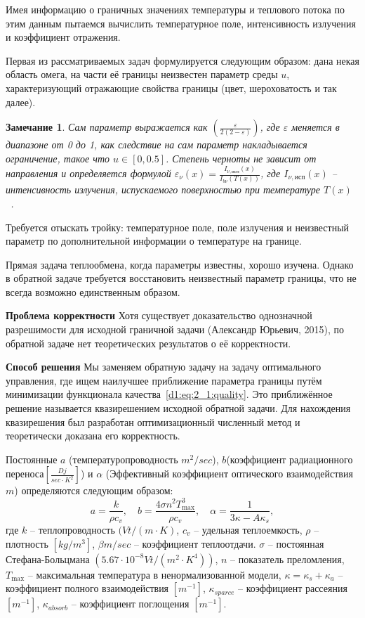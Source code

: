 \documentclass[8pt,a4paper]{article}
\newtheorem*{remark}{Замечание}
\begin{document}
    Имея информацию о граничных значениях температуры и теплового потока
    по этим данным пытаемся вычислить температурное поле, интенсивность излучения и коэффициент отражения.


    Первая из рассматриваемых задач формулируется следующим образом:
    дана некая область омега,
    на части её границы неизвестен параметр среды $u$, характеризующий отражающие свойства границы
    (цвет, шероховатость и так далее).
    \begin{remark}
        Сам параметр выражается как $(\frac{\varepsilon}{2(2-\varepsilon)})$,
        где $\varepsilon$ меняется в диапазоне от 0 до 1,
        как следствие на сам параметр накладывается ограничение, такое что $u \in [0, 0.5]$.
        Степень черноты не зависит от направления и определяется формулой
        $\varepsilon_\nu(x) = \frac{I_{\nu,\text{исп}}(x)}{I_{b\nu}(T(x))}$, где
        $I_{\nu,\text{исп}}(x)$ -- интенсивность излучения, испускаемого
        поверхностью при температуре $T(x)$~\cite[53]{Ozisik1976}.

    \end{remark}

    Требуется отыскать тройку: температурное поле,
    поле излучения и неизвестный параметр
    по дополнительной информации о температуре на границе.

    Прямая задача теплообмена, когда параметры известны, хорошо изучена.
    Однако в обратной задаче требуется восстановить неизвестный параметр границы,
    что не всегда возможно единственным образом.

    \textbf{Проблема корректности}
    Хотя существует доказательство однозначной разрешимости для исходной граничной задачи (Александр Юрьевич, 2015),
    по обратной задаче нет теоретических результатов о её корректности.

    \textbf{Способ решения}
    Мы заменяем обратную задачу на задачу оптимального управления, где ищем наилучшее
    приближение параметра границы путём минимизации функционала качества~\eqref{d1:eq:2_1:quality}.
    Это приближённое решение называется квазирешением исходной обратной задачи.
    Для нахождения квазирешения был разработан оптимизационный численный метод и теоретически доказана его корректность.

    Постоянные $a$ (температуропроводность $m^2/sec$), $b$(коэффициент радиационного переноса$[\frac{Dj}{sec \cdot K^2}]$) и
    $\alpha$ (Эффективный коэффициент оптического взаимодействия $m$)
    определяются следующим образом:
    \[
        a = \frac{k}{\rho c_v},\quad b = \frac{4\sigma n^2 T_{\max}^3}{\rho c_v},
        \quad \alpha=\frac{1}{3\kappa - A \kappa_s},
    \]
    где $k$ -- теплопроводность $(Vt/(m \cdot K)$, $c_v$ -- удельная теплоемкость,
    $\rho$ -- плотность $[kg/m^3]$,
    $\beta m/sec$ -- коэффициент теплоотдачи.
    $\sigma$ -- постоянная Стефана-Больцмана $(5.67 \cdot 10^{-8}Vt/(m^2 \cdot K^4))$,
    $n$ -- показатель преломления,
    $T_{\max}$ -- максимальная температура в ненормализованной модели,
    $\kappa = \kappa_s + \kappa_a$ -- коэффициент
    полного взаимодействия $[m^{-1}]$,
    $\kappa_{sparce}$ -- коэффициент рассеяния $[m^{-1}]$, $\kappa_{absorb}$ -- коэффициент поглощения $[m^{-1}]$.
\end{document}
